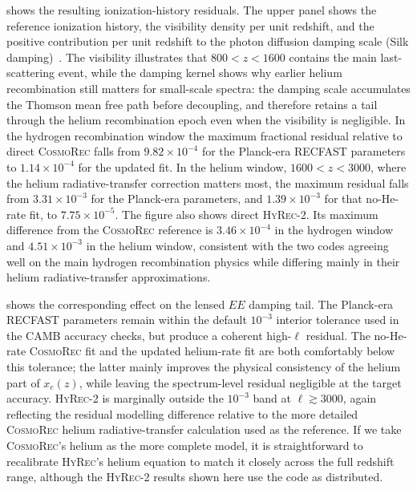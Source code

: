\documentclass[prd, twocolumn, superscriptaddress, tightenlines, longbibliography, nofootinbib, eqsecnum, amsfonts, amsmath, floatfix, notitlepage]{revtex4-2}
\begin{document}
 shows the resulting ionization-history
residuals. The upper panel shows the reference ionization history, the
visibility density per unit redshift, and the positive contribution per unit
redshift to the photon diffusion damping scale (Silk damping)~\cite{Silk:1968}. The
visibility illustrates that $800<z<1600$ contains the main last-scattering event,
while the damping kernel shows why earlier helium recombination still matters
for small-scale spectra: the damping scale accumulates the Thomson mean free
path before decoupling, and therefore retains a tail through the helium
recombination epoch even when the visibility is negligible. In the hydrogen
recombination window the maximum fractional residual relative to direct
\textsc{CosmoRec} falls from $9.82\times10^{-4}$ for the Planck-era \textsc{RECFAST}
parameters to $1.14\times10^{-4}$ for the updated fit.
In the helium window, $1600<z<3000$, where the helium
radiative-transfer correction matters most, the maximum residual falls from
$3.31\times10^{-3}$ for the Planck-era parameters, and $1.39\times10^{-3}$ for
that no-He-rate fit, to $7.75\times10^{-5}$. The figure also
shows direct \textsc{HyRec-2}. Its maximum difference from the \textsc{CosmoRec}
reference is $3.46\times10^{-4}$ in the hydrogen window and $4.51\times10^{-3}$
in the helium window, consistent with the two codes agreeing well on the main
hydrogen recombination physics while differing mainly in their helium
radiative-transfer approximations.

 shows the corresponding effect on the lensed
$EE$ damping tail. The Planck-era \textsc{RECFAST} parameters remain within the
default $10^{-3}$ interior tolerance used in the \textsc{CAMB} accuracy checks,
but produce a coherent high-$\ell$ residual. The no-He-rate \textsc{CosmoRec}
fit and the updated helium-rate fit are both comfortably below this tolerance;
the latter mainly improves the physical consistency of the helium part of
\(x_e(z)\), while leaving the spectrum-level residual negligible at the target
accuracy. \textsc{HyRec-2} is marginally outside the $10^{-3}$ band at
$\ell\gtrsim3000$, again reflecting the residual modelling difference relative
to the more detailed \textsc{CosmoRec} helium radiative-transfer calculation
used as the reference. If we take \textsc{CosmoRec}'s helium as the more complete model,
it is straightforward to recalibrate \textsc{HyRec}'s helium equation to match it closely
across the full redshift range, although the \textsc{HyRec-2} results shown here use the code as distributed.
\end{document}
